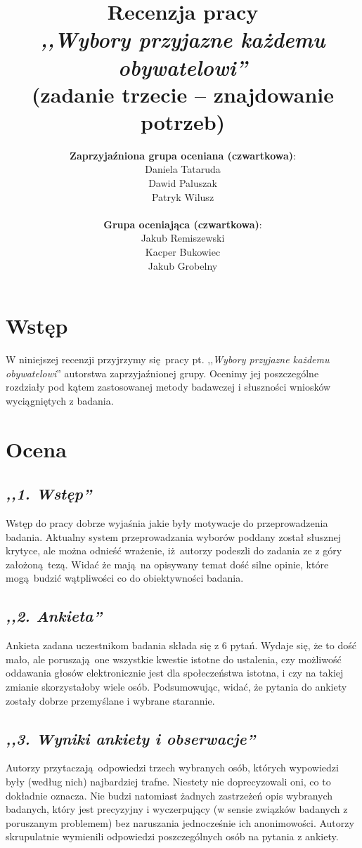 \documentclass[12pt, a4paper, oneside]{article}
\title{Recenzja pracy\\ \textit{,,Wybory przyjazne każdemu obywatelowi''}\\
       \large(zadanie trzecie -- znajdowanie potrzeb)}
\date{}
\author{
    \textbf{Zaprzyjaźniona grupa oceniana \small(czwartkowa)}:
        \\ Daniela Tataruda
        \\ Dawid Paluszak
        \\ Patryk Wilusz\\
    \\\textbf{Grupa oceniająca \small(czwartkowa)}:
        \\ Jakub Remiszewski
        \\ Kacper Bukowiec
        \\ Jakub Grobelny
}
\begin{document}
\begin{titlepage}
    \maketitle
\end{titlepage}

\section*{Wstęp}

W niniejszej recenzji przyjrzymy się pracy pt. ,,\textit{Wybory przyjazne 
każdemu obywatelowi}'' autorstwa zaprzyjaźnionej grupy. Ocenimy jej 
poszczególne rozdziały pod kątem zastosowanej metody badawczej i słuszności 
wniosków wyciągniętych z badania. 

\section*{Ocena}

\subsection*{\textit{,,1. Wstęp''}}

Wstęp do pracy dobrze wyjaśnia jakie były motywacje do przeprowadzenia badania. 
Aktualny system przeprowadzania wyborów poddany został słusznej krytyce, ale 
można odnieść wrażenie, iż autorzy podeszli do zadania ze z góry założoną tezą. 
Widać że mają na opisywany temat dość silne opinie, które mogą budzić 
wątpliwości co do obiektywności badania.

\subsection*{\textit{,,2. Ankieta''}}

Ankieta zadana uczestnikom badania składa się z 6 pytań. Wydaje się, że to dość 
mało, ale poruszają one wszystkie kwestie istotne do ustalenia, czy możliwość 
oddawania głosów elektronicznie jest dla społeczeństwa istotna, i czy na takiej 
zmianie skorzystałoby wiele osób. Podsumowując, widać, że pytania do ankiety zostały dobrze przemyślane i wybrane starannie.

\subsection*{\textit{,,3. Wyniki ankiety i obserwacje''}}

Autorzy przytaczają odpowiedzi trzech wybranych osób, których wypowiedzi były 
(według nich) najbardziej trafne. Niestety nie doprecyzowali oni, co to 
dokładnie oznacza. Nie budzi natomiast żadnych zastrzeżeń opis wybranych 
badanych, który jest precyzyjny i wyczerpujący (w sensie związków badanych z poruszanym problemem) bez naruszania jednocześnie ich anonimowości. 
Autorzy skrupulatnie wymienili odpowiedzi poszczególnych osób na pytania z 
ankiety.
\end{document}
